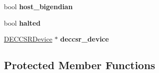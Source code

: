 \begin{DoxyCompactItemize}
\item 
\hypertarget{classvmips_a8e30b10692502c8dd15d53204fd7b9d5}{
bool {\bfseries host\_\-bigendian}}
\label{classvmips_a8e30b10692502c8dd15d53204fd7b9d5}

\item 
\hypertarget{classvmips_a302365e929db9b1a3a9fc11d2bea5c56}{
bool {\bfseries halted}}
\label{classvmips_a302365e929db9b1a3a9fc11d2bea5c56}

\item 
\hypertarget{classvmips_a514ae1b7c652d4a60afc146d5043b0a0}{
\hyperlink{classDECCSRDevice}{DECCSRDevice} $\ast$ {\bfseries deccsr\_\-device}}
\label{classvmips_a514ae1b7c652d4a60afc146d5043b0a0}

\end{DoxyCompactItemize}
\subsection*{Protected Member Functions}
